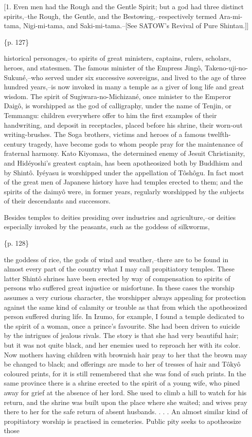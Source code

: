 [1. Even men had the Rough and the Gentle Spirit; but a god had three distinct spirits,--the Rough, the Gentle, and the Bestowing,--respectively termed Ara-mi-tama, Nigi-mi-tama, and Saki-mi-tama.--[See SATOW's Revival of Pure Shintau.]]

\{p. 127\}

historical personages,--to spirits of great ministers, captains, rulers, scholars, heroes, and statesmen. The famous minister of the Empress Jingô, Takeno-uji-no-Sukuné,--who served under six successive sovereigns, and lived to the age of three hundred years,--is now invoked in many a temple as a giver of long life and great wisdom. The spirit of Sugiwara-no-Michizané, once minister to the Emperor Daigô, is worshipped as the god of calligraphy, under the name of Tenjin, or Temmangu: children everywhere offer to him the first examples of their handwriting, and deposit in receptacles, placed before his shrine, their worn-out writing-brushes. The Soga brothers, victims and heroes of a famous twelfth-century tragedy, have become gods to whom people pray for the maintenance of fraternal harmony. Kato Kiyomasa, the determined enemy of Jesuit Christianity, and Hidéyoshi's greatest captain, has been apotheosized both by Buddhism and by Shintô. Iyéyasu is worshipped under the appellation of Tôshôgu. In fact most of the great men of Japanese history have had temples erected to them; and the spirits of the daimyô were, in former years, regularly worshipped by the subjects of their descendants and successors.



Besides temples to deities presiding over industries and agriculture,--or deities especially invoked by the peasants, such as the goddess of silkworms,

\{p. 128\}

the goddess of rice, the gods of wind and weather,--there are to be found in almost every part of the country what I may call propitiatory temples. These latter Shintô shrines have been erected by way of compensation to spirits of persons who suffered great injustice or misfortune. In these cases the worship assumes a very curious character, the worshipper always appealing for protection against the same kind of calamity or trouble as that from which the apotheosized person suffered during life. In Izumo, for example, I found a temple dedicated to the spirit of a woman, once a prince's favourite. She had been driven to suicide by the intrigues of jealous rivals. The story is that she had very beautiful hair; but it was not quite black, and her enemies used to reproach her with its color. Now mothers having children with brownish hair pray to her that the brown may be changed to black; and offerings are made to her of tresses of hair and Tôkyô coloured prints, for it is still remembered that she was fond of such prints. In the same province there is a shrine erected to the spirit of a young wife, who pined away for grief at the absence of her lord. She used to climb a hill to watch for his return, and the shrine was built upon the place where she waited; and wives pray there to her for the safe return of absent husbands. . . . An almost similar kind of propitiatory worship is practised in cemeteries. Public pity seeks to apotheosize those

